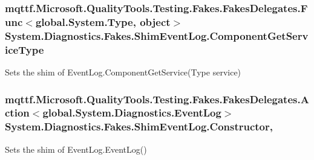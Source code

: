 \hypertarget{class_system_1_1_diagnostics_1_1_fakes_1_1_shim_event_log_a9528bca6df0b3e8fbd1b09cc051a2531}{
\subsubsection[{Component\-Get\-Service\-Type}]{\setlength{\rightskip}{0pt plus 5cm}mqttf.\-Microsoft.\-Quality\-Tools.\-Testing.\-Fakes.\-Fakes\-Delegates.\-Func$<$global.\-System.\-Type, object$>$ System.\-Diagnostics.\-Fakes.\-Shim\-Event\-Log.\-Component\-Get\-Service\-Type\hspace{0.3cm}{\ttfamily [set]}}}\label{class_system_1_1_diagnostics_1_1_fakes_1_1_shim_event_log_a9528bca6df0b3e8fbd1b09cc051a2531}


Sets the shim of Event\-Log.\-Component\-Get\-Service(\-Type service)

\hypertarget{class_system_1_1_diagnostics_1_1_fakes_1_1_shim_event_log_a7dfd53b57bce436f3b913b373104f8c3}{
\subsubsection[{Constructor}]{\setlength{\rightskip}{0pt plus 5cm}mqttf.\-Microsoft.\-Quality\-Tools.\-Testing.\-Fakes.\-Fakes\-Delegates.\-Action$<$global.\-System.\-Diagnostics.\-Event\-Log$>$ System.\-Diagnostics.\-Fakes.\-Shim\-Event\-Log.\-Constructor\hspace{0.3cm}{\ttfamily [static]}, {\ttfamily [set]}}}\label{class_system_1_1_diagnostics_1_1_fakes_1_1_shim_event_log_a7dfd53b57bce436f3b913b373104f8c3}


Sets the shim of Event\-Log.\-Event\-Log()

